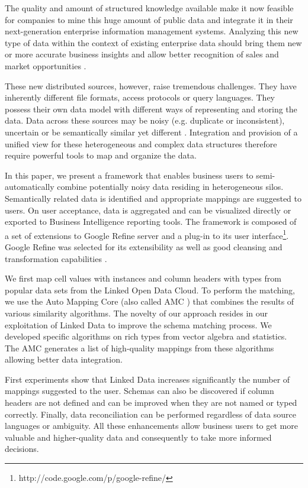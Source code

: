 \documentclass{sig-alternate}
\begin{document}
The quality and amount of structured knowledge available make it now feasible for companies to mine this huge amount of public data and integrate it in their next-generation enterprise information management systems. Analyzing this new type of data within the context of existing enterprise data should bring them new or more accurate business insights and allow better recognition of sales and market opportunities \cite{bigData}.

These new distributed sources, however, raise tremendous challenges. They have inherently different file formats, access protocols or query languages. They possess their own data model with different ways of representing and storing the data. Data across these sources may be noisy (e.g. duplicate or inconsistent), uncertain or be semantically similar yet different \cite{kavitha}. Integration and provision of a unified view for these heterogeneous and complex data structures therefore require powerful tools to map and organize the data.

In this paper, we present a framework that enables business users to semi-automatically combine potentially noisy data residing in heterogeneous silos. Semantically related data is identified and appropriate mappings are suggested to users. On user acceptance, data is aggregated and can be visualized directly or exported to Business Intelligence reporting tools. The framework is composed of a set of extensions to Google Refine server and a plug-in to its user interface\footnote{http://code.google.com/p/google-refine/}. Google Refine was selected for its extensibility as well as good cleansing and transformation capabilities \cite{bizer_linked_2009}.

We first map cell values with instances and column headers with types from popular data sets from the Linked Open Data Cloud. To perform the matching, we use the Auto Mapping Core (also called AMC \cite{conf/icde/PeukertER12}) that combines the results of various similarity algorithms. The novelty of our approach resides in our exploitation of Linked Data to improve the schema matching process. We developed specific algorithms on rich types from vector algebra and statistics. The AMC generates a list of high-quality mappings from these algorithms allowing better data integration.

First experiments show that Linked Data increases significantly the number of mappings suggested to the user. Schemas can also be discovered if column headers are not defined and can be improved when they are not named or typed correctly. Finally, data reconciliation can be performed regardless of data source languages or ambiguity. All these enhancements allow business users to get more valuable and higher-quality data and consequently to take more informed decisions.
\end{document}
